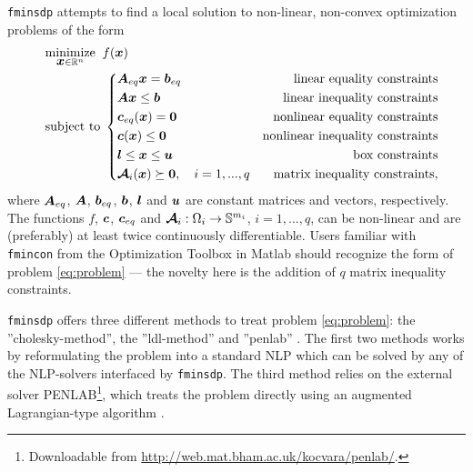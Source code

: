 \documentclass{article}
\newcommand{\bm}[1]{\mbox{\boldmath $#1$}}
\begin{document}
\texttt{fminsdp} attempts to find a local solution to non-linear, non-convex optimization problems of the form
\begin{equation}\label{eq:problem}
\quad
	\begin{aligned}
	&	\underset{\bm{x}\in\mathbb{R}^{n}}{\mbox{minimize}} \;\; f(\bm{x})  \\
	&	\mbox{subject to} \;
	\left\{
		\begin{aligned}
			& \bm{A}_{eq}\bm{x} = \bm{b}_{eq} & \mbox{linear equality constraints}      \\
			& \bm{A}\bm{x} \leq \bm{b}	      & \mbox{linear inequality constraints} \\
			& \bm{c}_{eq}(\bm{x}) = \bm{0}	 	& \mbox{nonlinear equality constraints}			\\		
		  & \bm{c}(\bm{x}) \leq \bm{0}			& \mbox{nonlinear inequality constraints}  \\			
			& \bm{l} \leq \bm{x} \leq \bm{u}	& \mbox{box constraints}\\
			& \bm{\mathcal{A}}_{i}(\bm{x}) \succeq \bm{0}, \quad i = 1,...,q & \mbox{matrix inequality constraints},
		\end{aligned}
		\right.
	\end{aligned}
\end{equation}
\vskip 2mm
\noindent where $\bm{A}_{eq}$, $\bm{A}$, $\bm{b}_{eq}$, $\bm{b}$, $\bm{l}$ and $\bm{u}$ are constant matrices and vectors, respectively. The functions $f$, $\bm{c}$,  $\bm{c}_{eq}$ and $\bm{\mathcal{A}}_{i}:\Omega_{i} \rightarrow \mathbb{S}^{m_{i}}$, $i = 1,...,q$, can be non-linear and are (preferably) at least 
twice continuously differentiable. Users familiar with \texttt{fmincon} from the Optimization Toolbox in Matlab \cite{fmincon:60} should recognize the 
form of problem \eqref{eq:problem} --- the novelty here is the addition of $q$ matrix inequality constraints. 

\texttt{fminsdp} offers three different methods to treat problem \eqref{eq:problem}: the ''cholesky-method'', the ''ldl-method'' \cite{Bogani:2009} and ''penlab'' \cite{Fiala:2013}. The first two methods works by reformulating the problem into a standard NLP which can be solved by any of the NLP-solvers interfaced by \texttt{fminsdp}. The third method relies on the external solver PENLAB\footnote{Downloadable from \url{http://web.mat.bham.ac.uk/kocvara/penlab/}.}, which treats the problem directly using an augmented Lagrangian-type algorithm \cite{Fiala:2013}.

\end{document}
